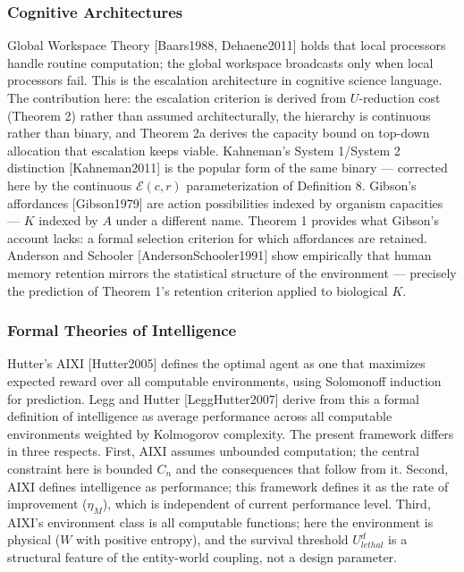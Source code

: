 \documentclass[
]{article}
\begin{document}
\subsubsection{Cognitive Architectures}\label{cognitive-architectures}

Global Workspace Theory {[}Baars1988, Dehaene2011{]} holds that local
processors handle routine computation; the global workspace broadcasts
only when local processors fail. This is the escalation architecture in
cognitive science language. The contribution here: the escalation
criterion is derived from \(U\)-reduction cost (Theorem 2) rather than
assumed architecturally, the hierarchy is continuous rather than binary,
and Theorem 2a derives the capacity bound on top-down allocation that
escalation keeps viable. Kahneman's System 1/System 2 distinction
{[}Kahneman2011{]} is the popular form of the same binary --- corrected
here by the continuous \(\mathcal{E}(c, r)\) parameterization of
Definition 8. Gibson's affordances {[}Gibson1979{]} are action
possibilities indexed by organism capacities --- \(K\) indexed by \(A\)
under a different name. Theorem 1 provides what Gibson's account lacks:
a formal selection criterion for which affordances are retained.
Anderson and Schooler {[}AndersonSchooler1991{]} show empirically that
human memory retention mirrors the statistical structure of the
environment --- precisely the prediction of Theorem 1's retention
criterion applied to biological \(K\).

\subsubsection{Formal Theories of
Intelligence}\label{formal-theories-of-intelligence}

Hutter's AIXI {[}Hutter2005{]} defines the optimal agent as one that
maximizes expected reward over all computable environments, using
Solomonoff induction for prediction. Legg and Hutter
{[}LeggHutter2007{]} derive from this a formal definition of
intelligence as average performance across all computable environments
weighted by Kolmogorov complexity. The present framework differs in
three respects. First, AIXI assumes unbounded computation; the central
constraint here is bounded \(C_n\) and the consequences that follow from
it. Second, AIXI defines intelligence as performance; this framework
defines it as the rate of improvement (\(\eta_M\)), which is independent
of current performance level. Third, AIXI's environment class is all
computable functions; here the environment is physical (\(W\) with
positive entropy), and the survival threshold \(U_{lethal}^d\) is a
structural feature of the entity-world coupling, not a design parameter.
\end{document}
